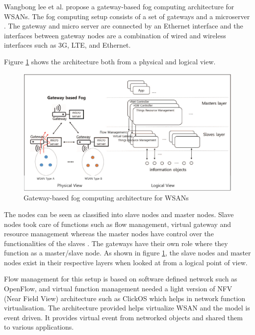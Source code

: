 \documentclass{article}
\begin{document}
Wangbong lee et al. \cite{lee2016gateway} propose a gateway-based fog computing architecture for WSANs. The fog computing setup consists of a set of gateways and a microserver \cite{lee2016gateway}.
The gateway and micro server are connected by an Ethernet interface and the interfaces between gateway nodes are a combination of wired and wireless interfaces such as 3G, LTE, and Ethernet\cite{lee2016gateway}.

Figure \ref{fig:gateway} shows the architecture both from a physical and logical view.

\begin{figure}
\centering
\includegraphics[scale=0.5]{gateway.png}
\caption{Gateway-based fog computing architecture for WSANs \cite{lee2016gateway}}
\label{fig:gateway}
\end{figure} 

The nodes can be seen as classified into slave nodes and master nodes. Slave nodes took care of functions such as flow management, virtual gateway and resource management whereas the master nodes have control over the functionalities of the slaves \cite{lee2016gateway}. The gateways have their own role where they function as a master/slave node. As shown in figure \ref{fig:gateway}, the slave nodes and master nodes exist in their respective layers when looked at from a logical point of view. 

Flow management for this setup is based on software defined network such as OpenFlow, and virtual function management needed a light version of NFV (Near Field View) architecture such as ClickOS \cite{martins2014clickos} which helps in network function virtualisation.
The architecture provided helps virtualize WSAN and the model is event driven. It provides virtual event from networked objects and shared them to various applications.
\end{document}
